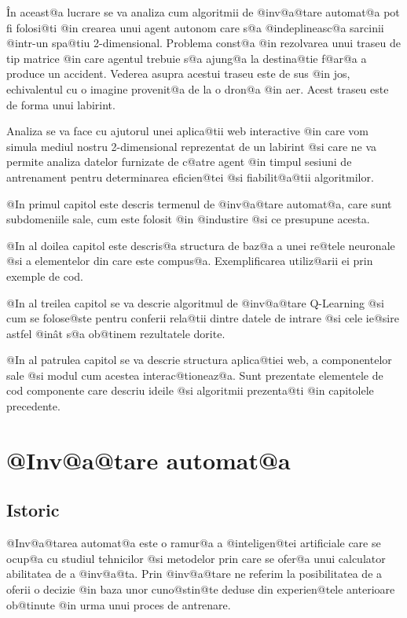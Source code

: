 \^ In aceast@a lucrare se va analiza cum algoritmii de @inv@a@tare automat@a  pot fi folosi@ti @in crearea unui agent autonom care s@a @indeplineasc@a sarcinii @intr-un spa@tiu 2-dimensional. Problema const@a @in rezolvarea unui traseu de tip matrice @in care agentul trebuie s@a ajung@a la destina@tie f@ar@a a produce un accident. Vederea asupra acestui traseu este de sus @in jos, echivalentul cu o imagine provenit@a de la o dron@a @in aer. Acest traseu este de forma unui labirint.  

Analiza se va face cu ajutorul unei aplica@tii web interactive @in care vom simula mediul nostru 2-dimensional reprezentat de un labirint @si care ne va permite analiza datelor furnizate de c@atre agent @in timpul sesiuni de antrenament pentru determinarea eficien@tei @si fiabilit@a@tii algoritmilor.


\hspace{0.2cm}

@In primul capitol este descris termenul de @inv@a@tare automat@a, care sunt subdomeniile sale, cum este folosit @in @industire @si ce presupune acesta. 

@In al doilea capitol este descris@a structura de baz@a a unei re@tele neuronale @si a elementelor din care este compus@a. Exemplificarea utiliz@arii ei prin exemple de cod.

@In al treilea capitol se va descrie algoritmul de @inv@a@tare Q-Learning @si cum se folose@ste pentru conferii rela@tii dintre datele de intrare @si cele ie@sire astfel @in\^ at s@a ob@tinem rezultatele dorite.

@In al patrulea capitol se va descrie structura aplica@tiei web, a componentelor sale @si modul cum acestea interac@tioneaz@a. Sunt prezentate elementele de cod componente care descriu ideile @si algoritmii prezenta@ti @in capitolele precedente.

\newpage

\chapter{ @Inv@a@tare automat@a }

\section{Istoric}

	@Inv@a@tarea automat@a este o ramur@a a @inteligen@tei artificiale care se ocup@a cu studiul tehnicilor @si metodelor prin care se ofer@a unui calculator abilitatea de a @inv@a@ta. Prin @inv@a@tare ne referim la posibilitatea de a oferii o decizie @in baza unor cuno@stin@te deduse din experien@tele anterioare ob@tinute @in urma unui proces de antrenare.

